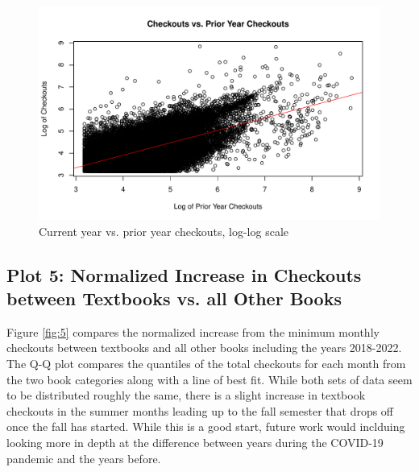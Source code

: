 \documentclass[10pt]{article}\usepackage[]{graphicx}\usepackage[]{xcolor}
\makeatletter
\def\maxwidth{ %
  \ifdim\Gin@nat@width>\linewidth
    \linewidth
  \else
    \Gin@nat@width
  \fi
}
\newenvironment{knitrout}{}{} %
\makeatother
\begin{document}
\begin{figure}[H]
\begin{center}
\begin{knitrout}
\color{fgcolor}
\includegraphics[width=\maxwidth]{figure/plot4-1} 
\end{knitrout}
\end{center}
\caption{Current year vs. prior year checkouts, log-log scale}\label{fig:4}
\end{figure}

\subsection{Plot 5: Normalized Increase in Checkouts between Textbooks vs. all Other Books}

Figure \ref{fig:5} compares the normalized increase from the minimum monthly checkouts between textbooks and all other books including the years 2018-2022. The Q-Q plot compares the quantiles of the total checkouts for each month from the two book categories along with a line of best fit. While both sets of data seem to be distributed roughly the same, there is a slight increase in textbook checkouts in the summer months leading up to the fall semester that drops off once the fall has started. While this is a good start, future work would inclduing looking more in depth at the difference between years during the COVID-19 pandemic and the years before.
\end{document}
